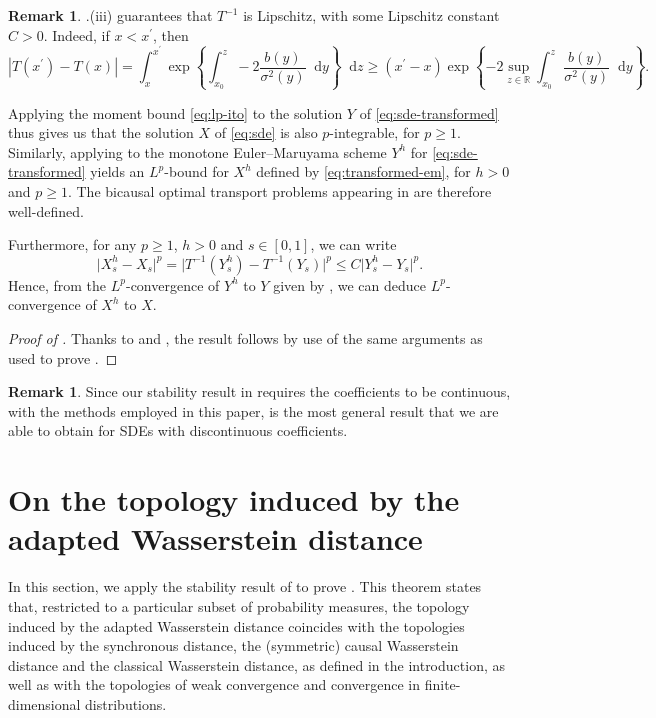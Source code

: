 \documentclass[oneside]{amsart}
\theoremstyle{definition}
\newtheorem{remark}[theorem]{Remark}
\newcommand{\R}{\mathbb R}
\newcommand{\D}{\mathop{}\!\mathrm{d}}
\def\R{{\mathbb R}}
\numberwithin{equation}{section}
\begin{document}
\begin{remark}\label{rem:discontinuous}
	.(iii) guarantees that $T^{-1}$ is Lipschitz, with some Lipschitz constant $C > 0$. Indeed, if $x < x^\prime$, then
	\begin{equation}
		|T(x^\prime) - T(x)| = \int_x^{x^\prime} \exp\!\left\{ \int_{x_0}^z -2\frac{b(y)}{\sigma^2(y)} \D y \right\} \D z \geq (x^\prime - x) \exp\!\left\{ -2 \sup_{z \in \R}\int_{x_0}^z \frac{b(y)}{\sigma^2(y)} \D y\right\}.
	\end{equation}
	
	Applying the moment bound \eqref{eq:lp-ito} to the solution $Y$ of \eqref{eq:sde-transformed} thus gives us that the solution $X$ of \eqref{eq:sde} is also $p$-integrable, for $p \ge 1$. Similarly, applying  to the monotone Euler--Maruyama scheme $Y^h$ for \eqref{eq:sde-transformed} yields an $L^p$-bound for $X^h$ defined by \eqref{eq:transformed-em}, for $h > 0$ and $p \geq 1$. 
	The bicausal optimal transport problems appearing in  are therefore well-defined.
	
	Furthermore, for any $p \ge 1$, $h > 0$ and $s \in [0, 1]$, we can write
	\begin{equation}
		\lvert X^h_s - X_s \rvert^p = \lvert T^{-1}(Y^h_s) - T^{-1}(Y_s)\rvert^p \leq C \lvert Y^h_s - Y_s\rvert^p.
	\end{equation}
	Hence, from the $L^p$-convergence of $Y^h$ to $Y$ given by , we can deduce $L^p$-convergence of $X^h$ to $X$.
\end{remark}


\begin{proof}[Proof of ]
Thanks to  and , the result follows by use of the same arguments as used to prove .
\end{proof}


\begin{remark}
Since our stability result in  requires the coefficients to be continuous, with the methods employed in this paper,  is the most general result that we are able to obtain for SDEs with discontinuous coefficients.
\end{remark}



\section{On the topology induced by the adapted Wasserstein distance}\label{sec:topology}
In this section, we apply the stability result of  to prove . This theorem states that, restricted to a particular subset of probability measures, the topology induced by the adapted Wasserstein distance coincides with the topologies induced by the synchronous distance, the (symmetric) causal Wasserstein distance and the classical Wasserstein distance, as defined in the introduction, as well as with the topologies of weak convergence and convergence in finite-dimensional distributions.
\end{document}
